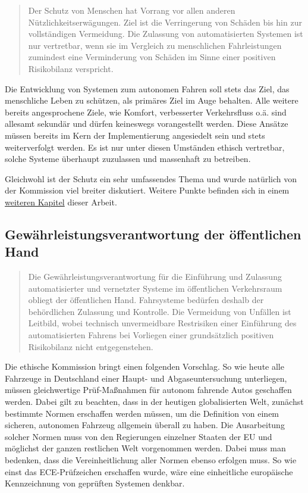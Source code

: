 \documentclass[twoside,a4paper,12pt]{article}
\begin{document}
\begin{quote}
\glqq
Der Schutz von Menschen hat Vorrang vor allen anderen Nützlichkeitserwägungen. Ziel
ist die Verringerung von Schäden bis hin zur vollständigen Vermeidung. Die Zulassung
von automatisierten Systemen ist nur vertretbar, wenn sie im Vergleich zu menschlichen
Fahrleistungen zumindest eine Verminderung von Schäden im Sinne einer positiven Risikobilanz verspricht.\grqq\mbox{~\cite[S. 10]{ek}}
\end{quote}
Die Entwicklung von Systemen zum autonomen Fahren soll stets das Ziel, das menschliche Leben zu schützen, 
als primäres Ziel im Auge behalten. Alle weitere bereits angesprochene Ziele, wie Komfort, verbesserter Verkehrsfluss o.ä. sind allesamt sekundär 
und dürfen keineswegs vorangestellt werden. Diese Ansätze müssen bereits im Kern der Implementierung angesiedelt sein und stets weiterverfolgt werden. Es ist nur unter diesen Umständen ethisch vertretbar, solche Systeme überhaupt zuzulassen und massenhaft zu betreiben.

Gleichwohl ist der Schutz ein sehr umfassendes Thema und wurde natürlich von der Kommission viel breiter diskutiert. Weitere Punkte  befinden sich in einem  \hyperlink{target1}{weiteren Kapitel}  dieser Arbeit.

\subsection{Gewährleistungsverantwortung der öffentlichen Hand} \label{GewaehrleistungsverantwortungDerOeffentlichenHand}

\begin{quote}
\glqq
Die Gewährleistungsverantwortung für die Einführung und Zulassung automatisierter
und vernetzter Systeme im öffentlichen Verkehrsraum obliegt der öffentlichen Hand.
Fahrsysteme bedürfen deshalb der behördlichen Zulassung und Kontrolle. Die Vermeidung von Unfällen ist Leitbild, wobei technisch 
unvermeidbare Restrisiken einer Einführung des automatisierten Fahrens bei Vorliegen einer grundsätzlich positiven Risikobilanz
nicht entgegenstehen.\grqq\mbox{~\cite[S. 10]{ek}}
\end{quote}
Die ethische Kommission bringt einen folgenden Vorschlag. So wie heute alle Fahrzeuge in Deutschland einer Haupt- und Abgaseuntersuchung unterliegen, müssen gleichwertige Prüf-Maßnahmen für autonom fahrende Autos geschaffen werden. Dabei gilt zu beachten, dass in der heutigen globalisierten Welt, zunächst bestimmte Normen erschaffen werden müssen, um die Definition von einem sicheren, autonomen Fahrzeug allgemein überall zu haben. Die Ausarbeitung solcher Normen muss von den Regierungen einzelner Staaten der EU und möglichst der ganzen restlichen Welt vorgenommen werden. Dabei muss man bedenken, dass die Vereinheitlichung aller Normen ebenso erfolgen muss. So wie einst das ECE-Prüfzeichen erschaffen wurde, wäre eine einheitliche europäische Kennzeichnung von geprüften Systemen denkbar.
\end{document}

